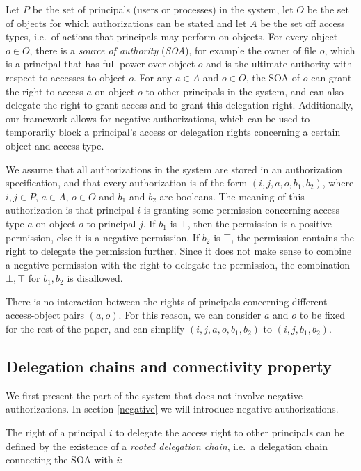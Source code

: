 \documentclass[runningheads]{llncs}
\begin{document}
Let $P$ be the set of principals (users or processes) in the system, let $O$ be the set of objects for which authorizations can be stated and let $A$ be the set off access types, i.e.\ of actions that principals may perform on objects. For every object $o \in O$, there is a \emph{source of authority} (\emph{SOA}), for example the owner of file $o$, which is a principal that has full power over object $o$ and is the ultimate authority with respect to accesses to object $o$. For any $a \in A$ and $o \in O$, the SOA of $o$ can grant the right to access $a$ on object $o$ to other principals in the system, and can also delegate the right to grant access and to grant this delegation right. Additionally, our framework allows for negative authorizations, which can be used to temporarily block a principal's access or delegation rights concerning a certain object and access type. 

We assume that all authorizations in the system are stored in an authorization specification, and that every authorization is of the form $(i,j,a,o,b_1,b_2)$, where $i,j \in P$, $a \in A$, $o \in O$ and $b_1$ and $b_2$ are booleans. The meaning of this authorization is that principal $i$ is granting some permission concerning access type $a$ on object $o$ to principal $j$. If $b_1$ is $\top$, then the permission is a positive permission, else it is a negative permission. If $b_2$ is $\top$, the permission contains the right to delegate the permission further. Since it does not make sense to combine a negative permission with the right to delegate the permission, the combination $\bot,\top$ for $b_1,b_2$ is disallowed.

There is no interaction between the rights of principals concerning different access-object pairs $(a,o)$. For this reason, we can consider $a$ and $o$ to be fixed for the rest of the paper, and can simplify $(i,j,a,o,b_1,b_2)$ to $(i,j,b_1,b_2)$.

\subsection{Delegation chains and connectivity property}
\label{delegation}
We first present the part of the system that does not involve negative authorizations. In section \ref{negative} we will introduce negative authorizations.

The right of a principal $i$ to delegate the access right to other principals can be defined by the existence of a \emph{rooted delegation chain}, i.e.\ a delegation chain connecting the SOA with $i$:
\end{document}
